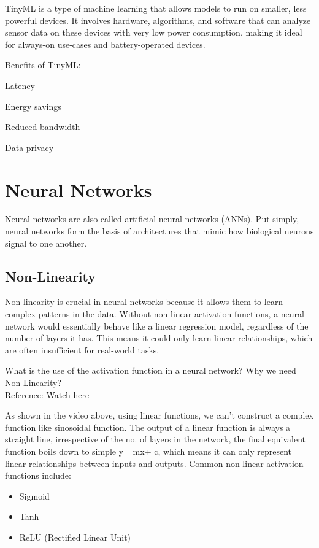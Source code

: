 \documentclass[12pt, a4paper]{article}
\begin{document}
\vspace{1em}
TinyML is a type of machine learning that allows models to run on smaller, less powerful devices. It involves hardware, algorithms, and software that can analyze sensor data on these devices with very low power consumption, making it ideal for always-on use-cases and battery-operated devices.

\vspace{1em}
Benefits of TinyML:
\begin{itemize}[nosep]
    \begin{minipage}[t]{0.45\textwidth}
        \item Latency
        \item Energy savings
    \end{minipage}
    \hfill
    \begin{minipage}[t]{0.45\textwidth}
        \item Reduced bandwidth
        \item Data privacy
    \end{minipage}
\end{itemize}

\section{Neural Networks}
Neural networks are also called artificial neural networks (ANNs). Put simply, neural networks form the basis of architectures that mimic how biological neurons signal to one another. 


\subsection{Non-Linearity}
Non-linearity is crucial in neural networks because it allows them to learn complex patterns in the data. Without non-linear activation functions, a neural network would essentially behave like a linear regression model, regardless of the number of layers it has. This means it could only learn linear relationships, which are often insufficient for real-world tasks.

What is the use of the activation function in a neural network? Why we need Non-Linearity?\\
Reference: \href{https://youtu.be/gmjzbpSVY1A?si=zNG1e_BFRNVhcYxt&t=370}{Watch here}

\vspace{0.5em}

As shown in the video above, using linear functions, we can't construct a complex function like sinosoidal function. The output of a linear function is always a straight line, irrespective of the no. of layers in the network, the final equivalent function boils down to simple y= mx+ c, which means it can only represent linear relationships between inputs and outputs. 
Common non-linear activation functions include:
\begin{itemize}[nosep]
    \item Sigmoid
    \item Tanh
    \item ReLU (Rectified Linear Unit)
\end{itemize}
\end{document}

